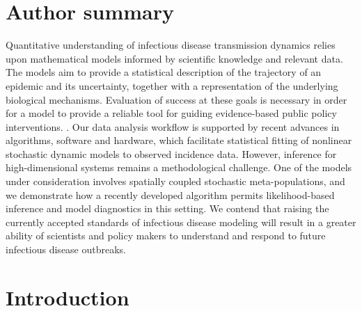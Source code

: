 \documentclass[10pt,letterpaper]{article}\usepackage[]{graphicx}\usepackage[table]{xcolor}
\begin{document}
\section*{Author summary}
Quantitative understanding of infectious disease transmission dynamics relies upon mathematical models informed by scientific knowledge and relevant data.
The models aim to provide a statistical description of the trajectory of an epidemic and its uncertainty, together with a representation of the underlying biological mechanisms.
Evaluation of success at these goals is necessary in order for a model to provide a reliable tool for guiding evidence-based public policy interventions.
.
\new{\editAuthorSum}
Our data analysis workflow is supported by recent advances in algorithms, software and hardware, which facilitate statistical fitting of nonlinear stochastic dynamic models to observed incidence data.
However, inference for high-dimensional systems remains a methodological challenge.
One of the models under consideration involves spatially coupled stochastic meta-populations, and we demonstrate how a recently developed algorithm permits likelihood-based inference and model diagnostics in this setting.
We contend that raising the currently accepted standards of infectious disease modeling will result in a greater ability of scientists and policy makers to understand and respond to future infectious disease outbreaks.

\linenumbers

\section*{Introduction}
\end{document}
